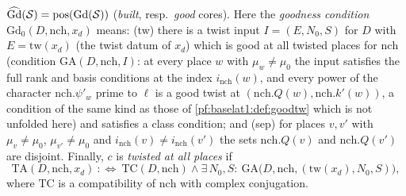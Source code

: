 \begin{definition}
$\widehat{\mathrm{Gd}}(\mathcal S)=\mathrm{pos}(\mathrm{Gd}(\mathcal S))$ (\emph{built}, resp.\ \emph{good}
cores). Here the \emph{goodness condition} $\mathrm{Gd}_0(D,\mathrm{nch},x_d)$ means: (tw) there is a twist
input $I=(E,N_0,S)$ for $D$ with $E=\mathrm{tw}(x_d)$ (the twist datum of $x_d$) which is good at all
twisted places for $\mathrm{nch}$ (condition $\mathrm{GA}(D,\mathrm{nch},I)$: at every place $w$ with
$\mu_w\ne\mu_0$ the input satisfies the full rank and basis conditions at the index $i_{\mathrm{nch}}(w)$,
and every power of the character $\mathrm{nch}.\psi'_w$ prime to $\ell$ is a good twist at
$(\mathrm{nch}.Q(w),\mathrm{nch}.k'(w))$, a condition of the same kind as those of \cref{pf:baselat1:def:goodtw}
which is not unfolded here) and satisfies a class condition; and (sep) for places $v,v'$ with
$\mu_v\neq\mu_0$, $\mu_{v'}\ne\mu_0$ and $i_{\mathrm{nch}}(v)\neq i_{\mathrm{nch}}(v')$ the sets
$\mathrm{nch}.Q(v)$ and $\mathrm{nch}.Q(v')$ are disjoint. Finally, $c$ is \emph{twisted at all places} if
\[
\mathrm{TA}(D,\mathrm{nch},x_d)\ :\Longleftrightarrow\ \mathrm{TC}(D,\mathrm{nch})\wedge
\exists\,N_0,S:\ \mathrm{GA}\bigl(D,\mathrm{nch},(\mathrm{tw}(x_d),N_0,S)\bigr),
\]
where $\mathrm{TC}$ is a compatibility of $\mathrm{nch}$ with complex conjugation.
%
\end{definition}


